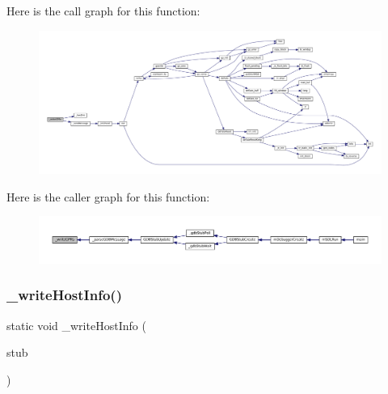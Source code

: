 Here is the call graph for this function\+:
\nopagebreak
\begin{figure}[H]
\begin{center}
\leavevmode
\includegraphics[width=350pt]{gdb-stub_8c_aa692d1765e005bcc6fa510f74a85c598_cgraph}
\end{center}
\end{figure}
Here is the caller graph for this function\+:
\nopagebreak
\begin{figure}[H]
\begin{center}
\leavevmode
\includegraphics[width=350pt]{gdb-stub_8c_aa692d1765e005bcc6fa510f74a85c598_icgraph}
\end{center}
\end{figure}
\mbox{\label{gdb-stub_8c_abf80181e6f4f0b39c329b802fa1cae95}} 
\subsubsection{\texorpdfstring{\+\_\+write\+Host\+Info()}{\_writeHostInfo()}}
{\footnotesize\ttfamily static void \+\_\+write\+Host\+Info (\begin{DoxyParamCaption}\item[{struct G\+D\+B\+Stub $\ast$}]{stub }\end{DoxyParamCaption})\hspace{0.3cm}{\ttfamily [static]}}

